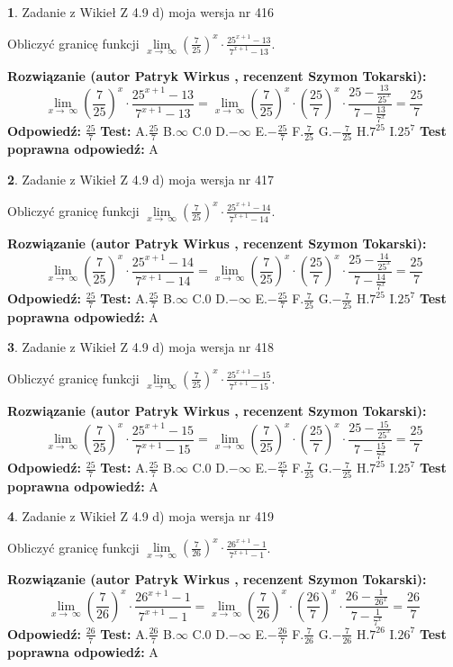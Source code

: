 \documentclass[12pt, a4paper]{article}
\theoremstyle{definition} %
\newtheorem{zad}{}
\newcommand{\zadStart}[1]{\begin{zad}#1\newline}
\newcommand{\zadStop}{\end{zad}}
\newcommand{\rozwStart}[2]{\noindent \textbf{Rozwiązanie (autor #1 , recenzent #2): }\newline}
\newcommand{\rozwStop}{\newline}
\newcommand{\odpStart}{\noindent \textbf{Odpowiedź:}\newline}
\newcommand{\odpStop}{\newline}
\newcommand{\testStart}{\noindent \textbf{Test:}\newline}
\newcommand{\testStop}{\newline}
\newcommand{\kluczStart}{\noindent \textbf{Test poprawna odpowiedź:}\newline}
\newcommand{\kluczStop}{\newline}
\begin{document}
\zadStart{Zadanie z Wikieł Z 4.9 d) moja wersja nr 416}


Obliczyć granicę funkcji  $\lim\limits_{x\to\ \infty}(\frac{7}{25})^{x}\cdot\frac{25^{x+1}-13}{7^{x+1}-13}$.
\zadStop
\rozwStart{Patryk Wirkus}{Szymon Tokarski}
$$\lim\limits_{x\to\ \infty}(\frac{7}{25})^{x}\cdot\frac{25^{x+1}-13}{7^{x+1}-13}=\lim\limits_{x\to\ \infty}(\frac{7}{25})^{x}\cdot(\frac{25}{7})^{x} \cdot \frac{25-\frac{13}{25^{x}}}{7-\frac{13}{7^{x}}} = \frac{25}{7}$$
\rozwStop
\odpStart
$\frac{25}{7}$
\odpStop
\testStart
A.$\frac{25}{7}$ B.$\infty$ C.$0$ D.$-\infty$ E.$-\frac{25}{7}$
F.$\frac{7}{25}$ G.$-\frac{7}{25}$
H.$7^{25}$
I.$25^{7}$
\testStop
\kluczStart
A
\kluczStop



\zadStart{Zadanie z Wikieł Z 4.9 d) moja wersja nr 417}


Obliczyć granicę funkcji  $\lim\limits_{x\to\ \infty}(\frac{7}{25})^{x}\cdot\frac{25^{x+1}-14}{7^{x+1}-14}$.
\zadStop
\rozwStart{Patryk Wirkus}{Szymon Tokarski}
$$\lim\limits_{x\to\ \infty}(\frac{7}{25})^{x}\cdot\frac{25^{x+1}-14}{7^{x+1}-14}=\lim\limits_{x\to\ \infty}(\frac{7}{25})^{x}\cdot(\frac{25}{7})^{x} \cdot \frac{25-\frac{14}{25^{x}}}{7-\frac{14}{7^{x}}} = \frac{25}{7}$$
\rozwStop
\odpStart
$\frac{25}{7}$
\odpStop
\testStart
A.$\frac{25}{7}$ B.$\infty$ C.$0$ D.$-\infty$ E.$-\frac{25}{7}$
F.$\frac{7}{25}$ G.$-\frac{7}{25}$
H.$7^{25}$
I.$25^{7}$
\testStop
\kluczStart
A
\kluczStop



\zadStart{Zadanie z Wikieł Z 4.9 d) moja wersja nr 418}


Obliczyć granicę funkcji  $\lim\limits_{x\to\ \infty}(\frac{7}{25})^{x}\cdot\frac{25^{x+1}-15}{7^{x+1}-15}$.
\zadStop
\rozwStart{Patryk Wirkus}{Szymon Tokarski}
$$\lim\limits_{x\to\ \infty}(\frac{7}{25})^{x}\cdot\frac{25^{x+1}-15}{7^{x+1}-15}=\lim\limits_{x\to\ \infty}(\frac{7}{25})^{x}\cdot(\frac{25}{7})^{x} \cdot \frac{25-\frac{15}{25^{x}}}{7-\frac{15}{7^{x}}} = \frac{25}{7}$$
\rozwStop
\odpStart
$\frac{25}{7}$
\odpStop
\testStart
A.$\frac{25}{7}$ B.$\infty$ C.$0$ D.$-\infty$ E.$-\frac{25}{7}$
F.$\frac{7}{25}$ G.$-\frac{7}{25}$
H.$7^{25}$
I.$25^{7}$
\testStop
\kluczStart
A
\kluczStop



\zadStart{Zadanie z Wikieł Z 4.9 d) moja wersja nr 419}


Obliczyć granicę funkcji  $\lim\limits_{x\to\ \infty}(\frac{7}{26})^{x}\cdot\frac{26^{x+1}-1}{7^{x+1}-1}$.
\zadStop
\rozwStart{Patryk Wirkus}{Szymon Tokarski}
$$\lim\limits_{x\to\ \infty}(\frac{7}{26})^{x}\cdot\frac{26^{x+1}-1}{7^{x+1}-1}=\lim\limits_{x\to\ \infty}(\frac{7}{26})^{x}\cdot(\frac{26}{7})^{x} \cdot \frac{26-\frac{1}{26^{x}}}{7-\frac{1}{7^{x}}} = \frac{26}{7}$$
\rozwStop
\odpStart
$\frac{26}{7}$
\odpStop
\testStart
A.$\frac{26}{7}$ B.$\infty$ C.$0$ D.$-\infty$ E.$-\frac{26}{7}$
F.$\frac{7}{26}$ G.$-\frac{7}{26}$
H.$7^{26}$
I.$26^{7}$
\testStop
\kluczStart
A
\kluczStop
\end{document}
